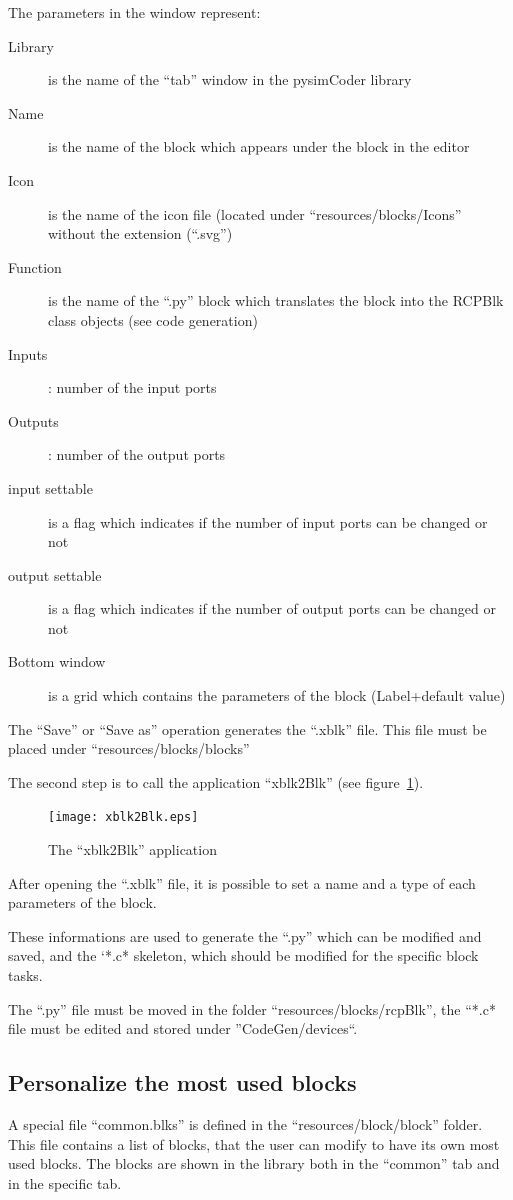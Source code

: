 The parameters in the window represent:
\begin{description}
\item[Library] is the name of the ``tab'' window in the pysimCoder library
\item [Name] is the name of the block which appears under the block in the editor
\item [Icon] is the name of the icon file (located under ``resources/blocks/Icons'' without the extension (``.svg'')
\item [Function] is the name of the ``.py'' block which translates the block into the RCPBlk class objects (see code generation)
\item [Inputs]: number of the input ports
\item [Outputs]: number of the output ports
\item [input settable]is a flag which indicates if the number of input ports can be changed or not
\item [output settable]is a flag which indicates if the number of output ports can be changed or not
\item [Bottom window] is a grid which contains the parameters of the block (Label+default value)
\end{description}

The ``Save'' or ``Save as'' operation generates the ``.xblk'' file. This file must be placed under ``resources/blocks/blocks''

The second step is to call the application ``xblk2Blk'' (see figure~\ref{Fig:xblk2Blk}).

\begin{figure}[htbp]	%
\centering
\texttt{[image: xblk2Blk.eps]}
\caption{The ``xblk2Blk'' application}
\label{Fig:xblk2Blk}
\end{figure}

After opening the ``.xblk'' file, it is possible to set a name and a type of each parameters of the block.

These informations are used to generate the ``.py'' which can be modified and saved, and the `*.c* skeleton, which should be modified for the specific block tasks.

The ``.py'' file must be moved in the folder ``resources/blocks/rcpBlk'', the ``*.c* file must be edited and stored under ''CodeGen/devices``.

\subsection{Personalize the most used blocks}
A special file ``common.blks'' is defined in the ``resources/block/block'' folder. This file contains a list of blocks, that the user can modify to have its own most used blocks. The blocks are shown in the library both in the ``common'' tab and in the specific tab.

